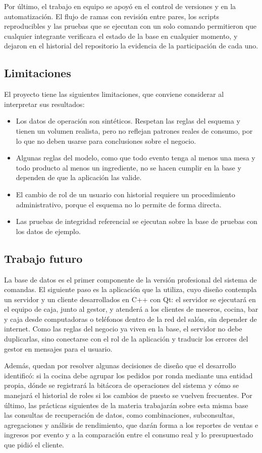 Por último, el trabajo en equipo se apoyó en el control de versiones y en la automatización. El flujo de ramas con revisión entre pares, los scripts reproducibles y las pruebas que se ejecutan con un solo comando permitieron que cualquier integrante verificara el estado de la base en cualquier momento, y dejaron en el historial del repositorio la evidencia de la participación de cada uno.

\subsection{Limitaciones}

El proyecto tiene las siguientes limitaciones, que conviene considerar al interpretar sus resultados:

\begin{itemize}
    \item Los datos de operación son sintéticos. Respetan las reglas del esquema y tienen un volumen realista, pero no reflejan patrones reales de consumo, por lo que no deben usarse para conclusiones sobre el negocio.
    \item Algunas reglas del modelo, como que todo evento tenga al menos una mesa y todo producto al menos un ingrediente, no se hacen cumplir en la base y dependen de que la aplicación las valide.
    \item El cambio de rol de un usuario con historial requiere un procedimiento administrativo, porque el esquema no lo permite de forma directa.
    \item Las pruebas de integridad referencial se ejecutan sobre la base de pruebas con los datos de ejemplo.
\end{itemize}

\subsection{Trabajo futuro}

La base de datos es el primer componente de la versión profesional del sistema de comandas. El siguiente paso es la aplicación que la utiliza, cuyo diseño contempla un servidor y un cliente desarrollados en C++ con Qt: el servidor se ejecutará en el equipo de caja, junto al gestor, y atenderá a los clientes de meseros, cocina, bar y caja desde computadoras o teléfonos dentro de la red del salón, sin depender de internet. Como las reglas del negocio ya viven en la base, el servidor no debe duplicarlas, sino conectarse con el rol de la aplicación y traducir los errores del gestor en mensajes para el usuario.

Además, quedan por resolver algunas decisiones de diseño que el desarrollo identificó: si la cocina debe agrupar los pedidos por ronda mediante una entidad propia, dónde se registrará la bitácora de operaciones del sistema y cómo se manejará el historial de roles si los cambios de puesto se vuelven frecuentes. Por último, las prácticas siguientes de la materia trabajarán sobre esta misma base las consultas de recuperación de datos, como combinaciones, subconsultas, agregaciones y análisis de rendimiento, que darán forma a los reportes de ventas e ingresos por evento y a la comparación entre el consumo real y lo presupuestado que pidió el cliente.
